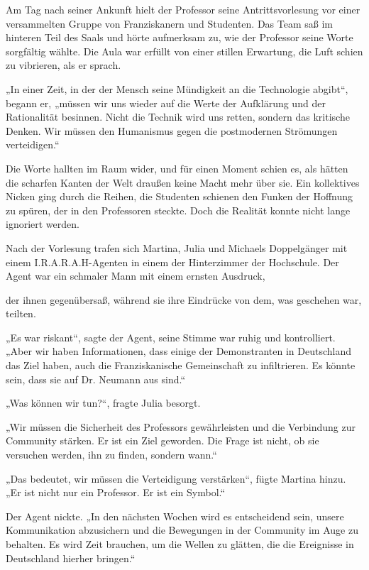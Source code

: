 \documentclass[
]{article}
\begin{document}
Am Tag nach seiner Ankunft hielt der Professor seine Antrittsvorlesung
vor einer versammelten Gruppe von Franziskanern und Studenten. Das Team
saß im hinteren Teil des Saals und hörte aufmerksam zu, wie der
Professor seine Worte sorgfältig wählte. Die Aula war erfüllt von einer
stillen Erwartung, die Luft schien zu vibrieren, als er sprach.

„In einer Zeit, in der der Mensch seine Mündigkeit an die Technologie
abgibt``, begann er, „müssen wir uns wieder auf die Werte der Aufklärung
und der Rationalität besinnen. Nicht die Technik wird uns retten,
sondern das kritische Denken. Wir müssen den Humanismus gegen die
postmodernen Strömungen verteidigen.``

Die Worte hallten im Raum wider, und für einen Moment schien es, als
hätten die scharfen Kanten der Welt draußen keine Macht mehr über sie.
Ein kollektives Nicken ging durch die Reihen, die Studenten schienen den
Funken der Hoffnung zu spüren, der in den Professoren steckte. Doch die
Realität konnte nicht lange ignoriert werden.

Nach der Vorlesung trafen sich Martina, Julia und Michaels Doppelgänger
mit einem I.R.A.R.A.H-Agenten in einem der Hinterzimmer der Hochschule.
Der Agent war ein schmaler Mann mit einem ernsten Ausdruck,

der ihnen gegenübersaß, während sie ihre Eindrücke von dem, was
geschehen war, teilten.

„Es war riskant``, sagte der Agent, seine Stimme war ruhig und
kontrolliert. „Aber wir haben Informationen, dass einige der
Demonstranten in Deutschland das Ziel haben, auch die Franziskanische
Gemeinschaft zu infiltrieren. Es könnte sein, dass sie auf Dr. Neumann
aus sind.``

„Was können wir tun?{\kern0pt}``, fragte Julia besorgt.

„Wir müssen die Sicherheit des Professors gewährleisten und die
Verbindung zur Community stärken. Er ist ein Ziel geworden. Die Frage
ist nicht, ob sie versuchen werden, ihn zu finden, sondern wann.``

„Das bedeutet, wir müssen die Verteidigung verstärken``, fügte Martina
hinzu. „Er ist nicht nur ein Professor. Er ist ein Symbol.``

Der Agent nickte. „In den nächsten Wochen wird es entscheidend sein,
unsere Kommunikation abzusichern und die Bewegungen in der Community im
Auge zu behalten. Es wird Zeit brauchen, um die Wellen zu glätten, die
die Ereignisse in Deutschland hierher bringen.``
\end{document}
